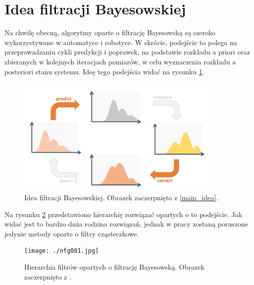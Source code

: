 \section{Idea filtracji Bayesowskiej}
Na chwilę obecną, algorytmy oparte o filtrację Bayesowską są szeroko wykorzystywane w automatyce i robotyce. W skrócie, podejście to polega na przeprowadzaniu cykli predykcji i poprawek, na podstawie rozkładu a priori oraz zbieranych w kolejnych iteracjach pomiarów, w celu wyznaczenia rozkładu a posteriori stanu systemu. Ideę tego podejścia widać na rysunku \ref{bayes_fil_idea}. 
\begin{figure}[H]
	\begin{center}
		\includegraphics[width=10cm]{./predict_update.png}
		\caption[Idea filtracji Bayesowskiej]{Idea filtracji Bayesowskiej. Obrazek zaczerpnięto z \ref{main_idea}.}
		\label{bayes_fil_idea}
	\end{center}
\end{figure}
Na rysunku \ref{filtr_hier} przedstawiono hierarchię rozwiązać opartych o to podejście. Jak widać jest to bardzo duża rodzina rozwiązań, jednak w pracy zostaną poruszone jedynie metody oparte o filtry cząsteczkowe.
\begin{figure}[H]
	\begin{center}
		\texttt{[image: ./nfg001.jpg]}
		\caption[Hierarchia filtrów opartych o filtrację Bayesowską.]{Hierarchia filtrów opartych o filtrację Bayesowską. Obrazek zaczerpnięto z \cite{prac_gui}.} \label{filtr_hier}
	\end{center}
\end{figure}
